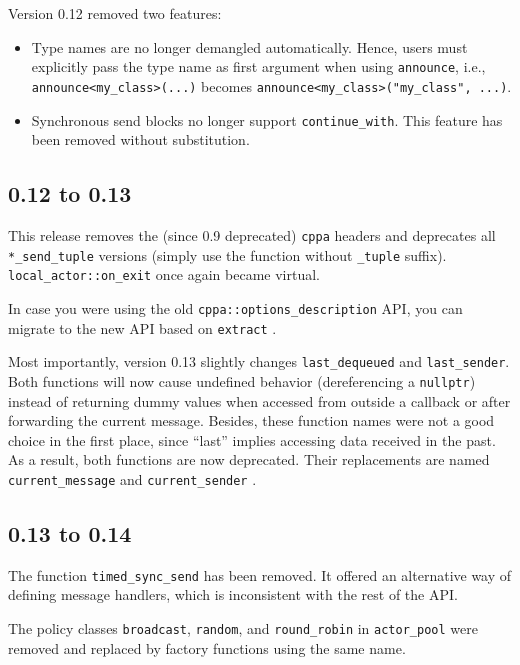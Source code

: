 Version 0.12 removed two features:

\begin{itemize}
\item
Type names are no longer demangled automatically.
Hence, users must explicitly pass the type name as first argument when using \lstinline^announce^, i.e., \lstinline^announce<my_class>(...)^ becomes \lstinline^announce<my_class>("my_class", ...)^.

\item
Synchronous send blocks no longer support \lstinline^continue_with^.
This feature has been removed without substitution.
\end{itemize}

\subsection{0.12 to 0.13}

This release removes the (since 0.9 deprecated) \lstinline^cppa^ headers and deprecates all \lstinline^*_send_tuple^ versions (simply use the function without \lstinline^_tuple^ suffix). \lstinline^local_actor::on_exit^ once again became virtual.

In case you were using the old \lstinline^cppa::options_description^ API, you can migrate to the new API based on \lstinline^extract^ .

Most importantly, version 0.13 slightly changes \lstinline^last_dequeued^ and \lstinline^last_sender^.
Both functions will now cause undefined behavior (dereferencing a \lstinline^nullptr^) instead of returning dummy values when accessed from outside a callback or after forwarding the current message.
Besides, these function names were not a good choice in the first place, since ``last'' implies accessing data received in the past.
As a result, both functions are now deprecated.
Their replacements are named \lstinline^current_message^ and \lstinline^current_sender^ .

\subsection{0.13 to 0.14}

The function \lstinline^timed_sync_send^ has been removed. It offered an alternative way of defining message handlers, which is inconsistent with the rest of the API.

The policy classes \lstinline^broadcast^, \lstinline^random^, and \lstinline^round_robin^ in \lstinline^actor_pool^ were removed and replaced by factory functions using the same name.

